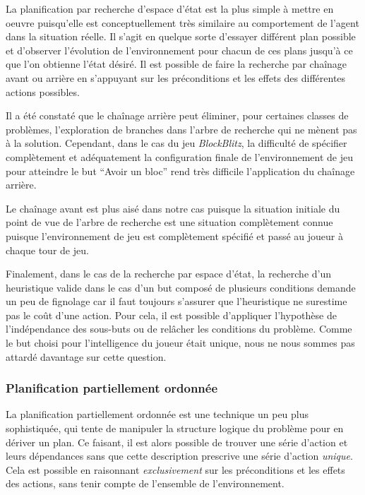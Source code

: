 \documentclass[12pt,english,frenchb,letterpaper]{article}
\begin{document}
La planification par recherche d'espace d'état est la plus simple à mettre en oeuvre puisqu'elle est conceptuellement très similaire au comportement de l'agent dans la situation réelle.  Il s'agit en quelque sorte d'essayer différent plan possible et d'observer l'évolution de l'environnement pour chacun de ces plans jusqu'à ce que l'on obtienne l'état désiré.  Il est possible de faire la recherche par chaînage avant ou arrière en s'appuyant sur les préconditions et les effets des différentes actions possibles.

Il a été constaté que le chaînage arrière peut éliminer, pour certaines classes de problèmes, l'exploration de branches dans l'arbre de recherche qui ne mènent pas à la solution.  Cependant, dans le cas du jeu \textit{BlockBlitz}, la difficulté de spécifier complètement et adéquatement la configuration finale de l'environnement de jeu pour atteindre le but ``Avoir un bloc'' rend très difficile l'application du chaînage arrière.

Le chaînage avant est plus aisé dans notre cas puisque la situation initiale du point de vue de l'arbre de recherche est une situation complètement connue puisque l'environnement de jeu est complètement spécifié et passé au joueur à chaque tour de jeu.

Finalement, dans le cas de la recherche par espace d'état, la recherche d'un heuristique valide dans le cas d'un but composé de plusieurs conditions demande un peu de fignolage car il faut toujours s'assurer que l'heuristique ne surestime pas le coût d'une action.  Pour cela, il est possible d'appliquer l'hypothèse de l'indépendance des sous-buts ou de relâcher les conditions du problème.  Comme le but choisi pour l'intelligence du joueur était unique, nous ne nous sommes pas attardé davantage sur cette question.

\subsubsection{Planification partiellement ordonnée}

La planification partiellement ordonnée est une technique un peu plus sophistiquée, qui tente de manipuler la structure logique du problème pour en dériver un plan.  Ce faisant, il est alors possible de trouver une série d'action et leurs dépendances sans que cette description prescrive une série d'action \textit{unique}.  Cela est possible en raisonnant \textit{exclusivement} sur les préconditions et les effets des actions, sans tenir compte de l'ensemble de l'environnement.
\end{document}

